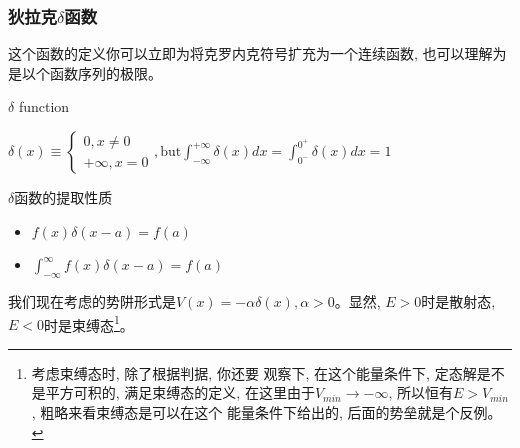 \documentclass[a4paper,zihao=-4,linespread=1]{ctexrep}
\begin{document}
    \subsubsection*{狄拉克$\delta$函数}
    这个函数的定义你可以立即为将克罗内克符号扩充为一个连续函数, 也可以理解为是以个函数序列的极限。
    \begin{define}{$\delta$ function}
        \begin{center}
            \begin{math}
                \displaystyle
                \delta(x)\equiv
                \begin{cases}
                    0, x\neq 0\\
                    +\infty,x=0
                \end{cases},\text{but}\int_{-\infty}^{+\infty}\delta(x) dx=\int_{0^-}^{0^+}\delta(x) dx=1
            \end{math}
        \end{center}
    \end{define}
    \begin{proposition}{$\delta$函数的提取性质}
        \begin{itemize}
            \item $f(x)\delta(x-a)=f(a)$
            \item $\int_{-\infty}^{\infty}f(x)\delta(x-a)=f(a)$
        \end{itemize}
    \end{proposition}
    我们现在考虑的势阱形式是$V(x)=-\alpha\delta(x),\alpha>0$。显然, $E>0$时是散射态, $E<0$时是束缚态\footnote{考虑束缚态时, 除了根据判据, 你还要
    观察下, 在这个能量条件下, 定态解是不是平方可积的, 满足束缚态的定义, 在这里由于$V_{min}\to -\infty$, 所以恒有$E>V_{min}$, 粗略来看束缚态是可以在这个
    能量条件下给出的, 后面的势垒就是个反例。}。
\end{document}
